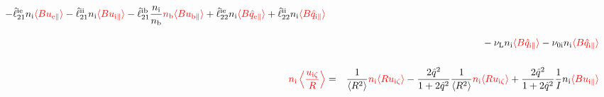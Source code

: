 \documentclass[11pt]{article}
\def\r#1{{\rm#1}}
\def\ave#1{\left\langle#1\right\rangle}
\def\aves#1{\langle#1\rangle}
\def\para{\parallel}
\def\ni{n_\r{i}}
\def\nb{n_\r{b}}
\def\uizt{u_{\r{i}\zeta}}
\def\uepara{u_{\r{e}\para}}
\def\uipara{u_{\r{i}\para}}
\def\ubpara{u_{\r{b}\para}}
\def\qhatepara{\hat{q}_{\r{e}\para}}
\def\qhatipara{\hat{q}_{\r{i}\para}}
\def\nuni{\nu_\r{0i}}
\def\nuL{\nu_\r{L}}
\def\red#1{\textcolor{red}{#1}}
\begin{document}
\begin{eqnarray}
%
  - \hat{\ell}_{21}^{\r{ie}} \ni \red{\aves{B \uepara}} 
  - \hat{\ell}_{21}^{\r{ii}} \ni \red{\aves{B \uipara}} 
  - \hat{\ell}_{21}^{\r{ib}} \frac{\ni}{\nb} \red{\nb \aves{B \ubpara}} 
%
  + \hat{\ell}_{22}^{\r{ie}} \ni \red{\aves{B \qhatepara}} 
  + \hat{\ell}_{22}^{\r{ii}} \ni \red{\aves{B \qhatipara}} 
\nonumber\\[3mm]&&{}
%
  - \nuL \ni \red{\aves{B \qhatipara}}
%
  - \nuni \ni \red{\aves{B \qhatipara}}
\\[5mm]
    \red{\ni \ave{\frac{\uizt}{R}}} &=&
%
    \frac{1}{\aves{R^2}} \red{\ni \aves{R\uizt}}
%
  - \frac{2\hat{q}^2}{1+2\hat{q}^2} \frac{1}{\aves{R^2}}\red{\ni\aves{R\uizt}}
%
  + \frac{2\hat{q}^2}{1+2\hat{q}^2} \frac{1}{I}\ni \red{\aves{B\uipara}}
\end{eqnarray}
%
\end{document}
